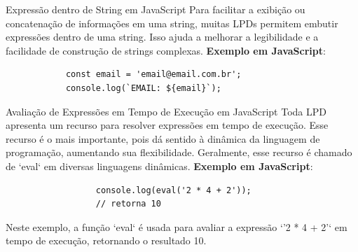 \documentclass{beamer}
\begin{document}
\begin{frame}[fragile]{Expressão dentro de String em JavaScript}\justifying
	Para facilitar a exibição ou concatenação de informações em uma string, muitas LPDs permitem embutir expressões dentro de uma string. Isso ajuda a melhorar a legibilidade e a facilidade de construção de strings complexas.
	\textbf{Exemplo em JavaScript}:
	\begin{verbatim}
            const email = 'email@email.com.br';
            console.log(`EMAIL: ${email}`);
            \end{verbatim}
\end{frame}
\begin{frame}[fragile]{Avaliação de Expressões em Tempo de Execução em JavaScript}\justifying
	Toda LPD apresenta um recurso para resolver expressões em tempo de execução. Esse recurso é o mais importante, pois dá sentido à dinâmica da linguagem de programação, aumentando sua flexibilidade. Geralmente, esse recurso é chamado de `eval` em diversas linguagens dinâmicas.
	\textbf{Exemplo em JavaScript}:
	\begin{verbatim}
                  console.log(eval('2 * 4 + 2'));
                  // retorna 10
                  \end{verbatim}
	Neste exemplo, a função `eval` é usada para avaliar a expressão `'2 * 4 + 2'` em tempo de execução, retornando o resultado 10.
\end{frame}
\end{document}
